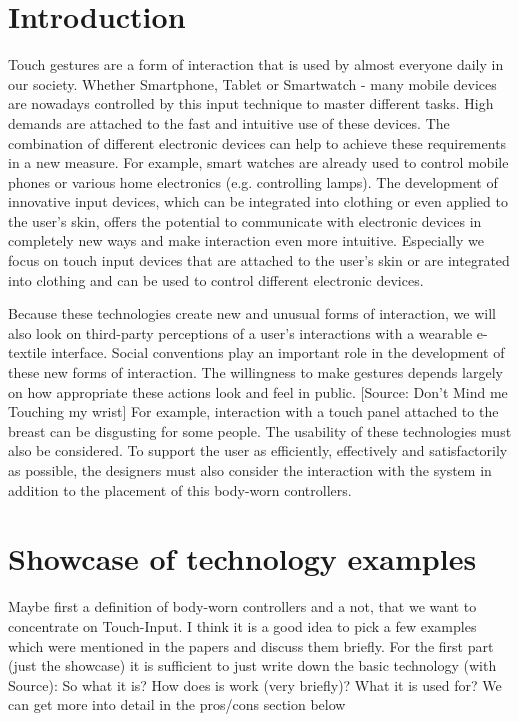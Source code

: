 \documentclass{sigchi}
\begin{document}
\section{Introduction}
%

Touch gestures are a form of interaction that is used by almost everyone daily in our society. Whether Smartphone, Tablet or Smartwatch - many mobile devices are nowadays controlled by this input technique to master different tasks. High demands are attached to the fast and intuitive use of these devices. The combination of different electronic devices can help to achieve these requirements in a new measure. For example, smart watches are already used to control mobile phones or various home electronics (e.g. controlling lamps). The development of innovative input devices, which can be integrated into clothing or even applied to the user's skin, offers the potential to communicate with electronic devices in completely new ways and make interaction even more intuitive. Especially we focus on touch input devices that are attached to the user's skin or are integrated into clothing and can be used to control different electronic devices.

Because these technologies create new and unusual forms of interaction, we will also look on third-party perceptions of a user’s interactions with a wearable e-textile interface. Social conventions play an important role in the development of these new forms of interaction. The willingness to make gestures depends largely on how appropriate these actions look and feel in public. [Source: Don’t Mind me Touching my wrist] For example, interaction with a touch panel attached to the breast can be disgusting for some people. The usability of these technologies must also be considered. To support the user as efficiently, effectively and satisfactorily as possible, the designers must also consider the interaction with the system in addition to the placement of this body-worn controllers.



\section{Showcase of technology examples}

Maybe first a definition of body-worn controllers and a not, that we want to concentrate on Touch-Input.
I think it is a good idea to pick a few examples which were mentioned in the papers and discuss them briefly.
For the first part (just the showcase) it is sufficient to just write down the basic technology (with Source): So what it is? How does is work (very briefly)? What it is used for?
We can get more into detail in the pros/cons section below
\end{document}
